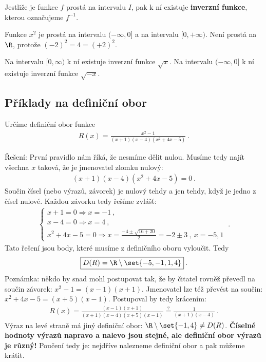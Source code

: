 Jestliže je funkce $f$ prostá na intervalu $I$, pak k ní existuje \textbf{inverzní funkce}, kterou označujeme $f^{-1}$.

\begin{example}
    Funkce $x^2$ je prostá na intervalu $(-\infty, 0]$ a na intervalu $[0,+\infty)$. Není prostá na $\R$, protože $(-2)^2 = 4 = (+2)^2$.

    Na intervalu $[0,\infty)$ k ní existuje inverzní funkce $\sqrt{x}$. Na intervalu $(-\infty,0]$ k ní existuje inverzní funkce $\sqrt{-x}$.
\end{example}



\subsection{Příklady na definiční obor}

\begin{example}
    Určíme definiční obor funkce \begin{align*}
        R(x) = \frac{x^2-1}{(x+1)(x-4)(x^2 + 4x - 5)} \:.
    \end{align*}

    Řešení: První pravidlo nám říká, že nesmíme dělit nulou. Musíme tedy najít všechna $x$ taková, že je jmenovatel zlomku nulový: \begin{align*}
        (x+1)(x-4)(x^2 + 4x - 5) = 0 \:.
    \end{align*}
    Součin čísel (nebo výrazů, závorek) je nulový tehdy a jen tehdy, když je jedno z čísel nulové. Každou závorku tedy řešíme zvlášť:
    \begin{align*}
        \begin{cases}
            x+1 = 0 \Longrightarrow x = -1 \:, \\
        x-4 = 0 \Longrightarrow x = 4 \:, \\
        x^2 + 4x - 5 = 0 \Longrightarrow x = \frac{-4 \pm \sqrt{16+20}}{2} = - 2 \pm 3 \:, \: x = -5, 1
        \end{cases}
         \:.
    \end{align*}
    Tato řešení jsou body, které musíme z definičního oboru vyloučit. Tedy \begin{align*}
        \boxed{D(R) = \R \setminus \set{-5,-1,1,4} }\:.
    \end{align*}
    Poznámka: někdo by snad mohl postupovat tak, že by čitatel rovněž převedl na součin závorek: $x^2-1 = (x-1)(x+1)$. Jmenovatel lze též převést na součin: $x^2+4x-5 = (x+5)(x-1)$. Postupoval by tedy krácením:
    \begin{align*}
        R(x) = \frac{(x-1)(x+1)}{(x+1)(x-4)(x+5)(x-1)} \overset{?}{=} \frac{1}{(x+1)(x-4)} \:.
    \end{align*}
    Výraz na levé straně má jiný definiční obor: $\R \setminus \set{-1,4} \neq D(R)$.
    \textbf{Číselné hodnoty výrazů napravo a nalevo jsou stejné, ale definiční obor výrazů je různý!} Poučení tedy je: nejdříve nalezneme definiční obor a pak můžeme krátit.
\end{example}

